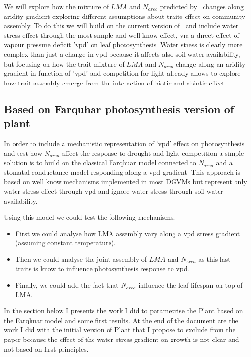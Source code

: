 \documentclass[a4paper,11pt]{article}
\begin{document}
We will explore how the mixture of $LMA$ and $N_{area}$ predicted by \plant\ changes along aridity gradient exploring different assumptions about traits effect on community assembly. To do this we will build on the current version of \plant\ and include water stress effect through the most simple and well know effect, via a direct effect of vapour pressure deficit 'vpd' on leaf photosynthesis. Water stress is clearly more complex than just a change in vpd because it affects also soil water availability, but focusing on how the trait mixture of $LMA$ and $N_{area}$ change along an aridity gradient in function of 'vpd' and competition for light already allows to explore how trait assembly emerge from the interaction of biotic and abiotic effect.

\subsection{Based on Farquhar photosynthesis version of plant}

In order to include a mechanistic representation of 'vpd' effect on photosynthesis and test how $N_{area}$ affect the response to drought and light competition a simple solution is to build on the classical Farqhuar model connected to $N_{area}$ and a stomatal
  conductance model responding along a vpd gradient. This approach
  is based on well know mechanisms implemented in most DGVMs but
  represent only water stress effect through vpd and ignore water stress through soil water availability.

Using this model we could test the following mechanisms.

\begin{itemize}

\item First we could analyse how LMA assembly vary along a vpd stress gradient (assuming constant temperature).

\item Then we could analyse the joint assembly of $LMA$ and $N_{area}$ as this last traits is know to influence photosynthesis response to vpd.

\item Finally, we could add the fact that $N_{area}$ influence the leaf lifespan on top of LMA.

\end{itemize}

In the section below I presents the work I did to parametrise the Plant based on the Farqhuar model and some first results. At the end of the document are the work I did with the initial version of Plant that I propose to exclude from the paper because the effect of the water stress gradient on growth is not clear and not based on first principles.
\end{document}
